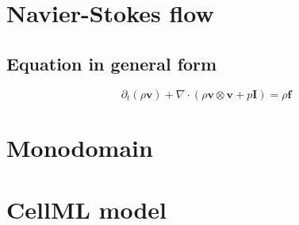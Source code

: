 \documentclass[
10pt, %
a4paper, %
oneside, %
headinclude,footinclude, %
BCOR5mm, %
]{scrartcl}
\begin{document}
\section{Navier-Stokes flow}
%
\subsection{Equation in general form}
%
\begin{equation}
    \partial_{t} (\rho \boldsymbol{v}) + \nabla \cdot (\rho \boldsymbol{v} \otimes \boldsymbol{v} + p \boldsymbol{I}) = \rho \boldsymbol{f}
\end{equation}
%
%
%

%
%
\clearpage
%
\section{Monodomain}
%



%
%
\clearpage
%
\section{CellML model}
%
%
%
%
%
\clearpage
%


\end{document}

